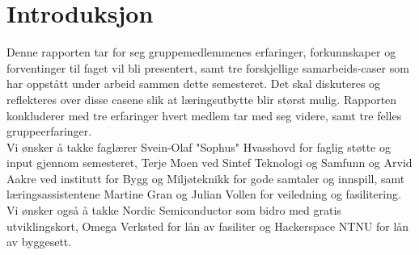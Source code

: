 \chapter{Introduksjon}


Denne rapporten tar for seg gruppemedlemmenes erfaringer, forkunnskaper og forventinger til faget vil bli presentert, samt tre forskjellige samarbeids-caser som har oppstått under arbeid sammen dette semesteret. Det skal diskuteres og reflekteres over disse casene slik at læringsutbytte blir størst mulig. Rapporten konkluderer med tre erfaringer hvert medlem tar med seg videre, samt tre felles gruppeerfaringer.\\

Vi ønsker å takke faglærer Svein-Olaf "Sophus" Hvasshovd for faglig støtte og input gjennom semesteret, Terje Moen ved Sintef Teknologi og Samfunn og Arvid Aakre ved institutt for Bygg og Miljøteknikk for gode samtaler og innspill, samt læringsassistentene Martine Gran og Julian Vollen for veiledning og fasilitering. Vi ønsker også å takke Nordic Semiconductor som bidro med gratis utviklingskort, Omega Verksted for lån av fasiliter og Hackerspace NTNU for lån av byggesett.



